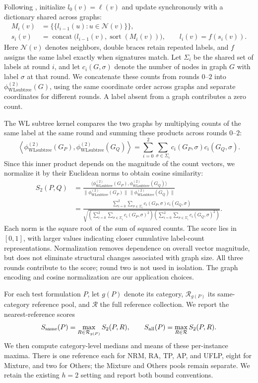 \documentclass[10pt]{article}
\newcommand{\WL}{\mathrm{WLsubtree}}
\begin{document}
Following \citet{Shervashidze2011}, initialize $l_0(v)=\ell(v)$ and update
synchronously with a dictionary shared across graphs:
\[
\begin{aligned}
M_i(v)&=\{\!\{l_{i-1}(u):u\in\mathcal N(v)\}\!\},\\
s_i(v)&=\operatorname{concat}
 \big(l_{i-1}(v),\operatorname{sort}(M_i(v))\big),\qquad
l_i(v)=f(s_i(v)).
\end{aligned}
\]
Here $\mathcal N(v)$ denotes neighbors, double braces retain repeated
labels, and $f$ assigns the same label exactly when signatures match.
Let $\Sigma_i$ be the shared set of labels at round $i$, and let
$c_i(G,\sigma)$ denote the number of nodes in graph $G$ with label
$\sigma$ at that round. We concatenate these counts from rounds
$0$--$2$ into $\phi^{(2)}_{\WL}(G)$, using the same coordinate order
across graphs and separate coordinates for different rounds.
A label absent from a graph contributes a zero count.

The WL subtree kernel compares the two graphs by multiplying counts
of the same label at the same round and summing these products across
rounds $0$--$2$:
\[
\left\langle\phi^{(2)}_{\WL}(G_P),\phi^{(2)}_{\WL}(G_Q)\right\rangle
=\sum_{i=0}^{2}\sum_{\sigma\in\Sigma_i}
c_i(G_P,\sigma)c_i(G_Q,\sigma).
\]
Since this inner product depends on the magnitude of the count vectors,
we normalize it by their Euclidean norms to obtain cosine similarity:
\[
\begin{aligned}
S_2(P,Q)
&=\frac{\langle\phi^{(2)}_{\WL}(G_P),\phi^{(2)}_{\WL}(G_Q)\rangle}
{\|\phi^{(2)}_{\WL}(G_P)\|\,\|\phi^{(2)}_{\WL}(G_Q)\|}\\
&=\frac{\displaystyle\sum_{i=0}^{2}\sum_{\sigma\in\Sigma_i}
c_i(G_P,\sigma)c_i(G_Q,\sigma)}
{\displaystyle\sqrt{
\left(\sum_{i=0}^{2}\sum_{\sigma\in\Sigma_i}c_i(G_P,\sigma)^2\right)
\left(\sum_{i=0}^{2}\sum_{\sigma\in\Sigma_i}c_i(G_Q,\sigma)^2\right)}}.
\end{aligned}
\]
Each norm is the square root of the sum of squared counts.
The score lies in $[0,1]$, with larger values indicating closer
cumulative label-count representations. Normalization removes dependence
on overall vector magnitude, but does not eliminate structural changes
associated with graph size. All three rounds contribute to the score;
round two is not used in isolation. The graph encoding and cosine
normalization are our application choices.

For each test formulation $P$, let $g(P)$ denote its category,
$\mathcal R_{g(P)}$ its same-category reference pool, and $\mathcal R$
the full reference collection. We report the nearest-reference scores
\[
S_{\rm same}(P)=\max_{R\in\mathcal R_{g(P)}}S_2(P,R),
\qquad
S_{\rm all}(P)=\max_{R\in\mathcal R}S_2(P,R).
\]
We then compute category-level medians and means of these per-instance
maxima. There is one reference each for NRM, RA, TP, AP, and UFLP,
eight for Mixture, and two for Others; the Mixture and Others pools
remain separate. We retain the existing $h=2$ setting and report both
bound conventions.
\end{document}

